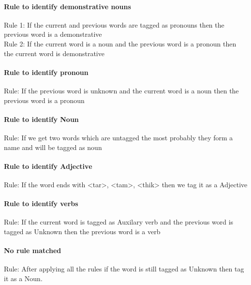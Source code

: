 \paragraph{Rule to identify demonstrative nouns}
Rule 1: If the current and previous words are tagged as pronouns then the previous word is a demonstrative \\
Rule 2: If the current word is a noun and the previous word is a pronoun then the current word is demonstrative
		
\paragraph{Rule to identify pronoun}
Rule: If the previous word is unknown and the current word is a noun then the previous word is a pronoun
		
\paragraph{Rule to identify Noun}		
Rule: If we get two words which are untagged the most probably they form a name and will be tagged as noun
		
\paragraph{Rule to identify Adjective}
Rule: If the word ends with <tar>, <tam>, <thik> then we tag it as a Adjective
		
\paragraph{Rule to identify verbs}
Rule: If the current word is tagged as Auxilary verb  and the previous word is tagged as Unknown then  the previous word is a verb

\paragraph{No rule matched} 
Rule: After applying all the rules if the word is still tagged as Unknown then tag it as a Noun.

